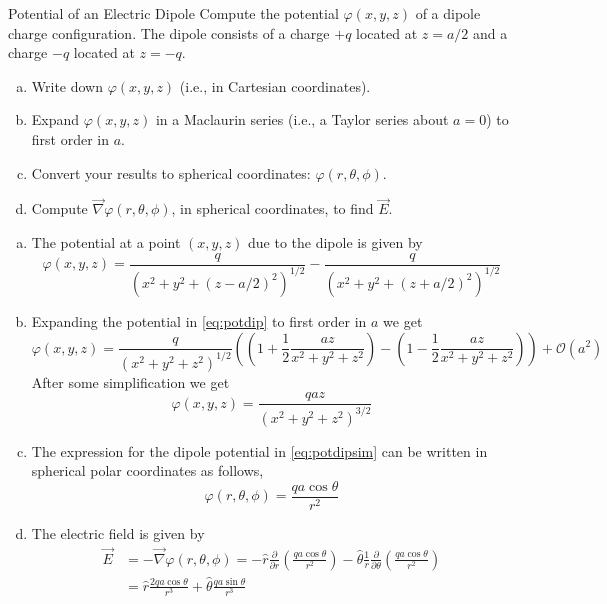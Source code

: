 \documentclass{esg8022pset}
\newcommand{\dtheta}{\frac{\partial}{\partial \theta}}
\newcommand{\dr}{\frac{\partial}{\partial r}}
\begin{document}
\begin{problem}{Potential of an Electric Dipole}
  Compute the potential $\varphi(x,y,z)$ of a dipole charge configuration.  The dipole consists of a charge $+q$ located at $z = a/2$ and a charge $-q$ located at $z=-q$.
  \begin{enumerate}[(a)]
    \item Write down $\varphi(x,y,z)$ (i.e., in Cartesian coordinates).
    \item Expand $\varphi(x,y,z)$ in a Maclaurin series (i.e., a Taylor series about $a=0$) to first order in $a$.
    \item Convert your results to spherical coordinates: $\varphi(r, \theta, \phi)$. 
    \item Compute $\vec{\nabla}\varphi(r, \theta, \phi)$, in spherical coordinates, to find $\vec{E}$. %
  \end{enumerate}
\end{problem}
\begin{solution}
  \begin{enumerate}[(a)]
    \item The potential at a point $(x,y,z)$ due to the dipole is given by
      \begin{equation}
        \varphi(x,y,z) = \frac{q}{\left( x^2 + y^2 +(z-a/2)^2 \right)^{1/2}} - \frac{q}{\left( x^2 + y^2 +(z+a/2)^2 \right)^{1/2}} \label{eq:potdip}
      \end{equation}
    \item Expanding the potential in \autoref{eq:potdip} to first order in $a$ we get
      $$\varphi(x,y,z) = \frac{q}{\left( x^2 + y^2 +z^2 \right)^{1/2}}\left( \left( 1+ \frac{1}{2} \frac{az}{x^2 + y^2 + z^2} \right) - \left(1-\frac{1}{2} \frac{az}{x^2 + y^2 + z^2} \right)\right) + \mathcal O(a^2)$$
      After some simplification we get
      \begin{equation}  \varphi(x,y,z) = \frac{q az}{\left( x^2 + y^2 +z^2 \right)^{3/2}} \label{eq:potdipsim}\end{equation}
    \item The expression for the dipole potential in \autoref{eq:potdipsim} can be written in spherical polar coordinates as follows,
      $$\varphi(r,\theta,\phi) = \frac{q a \cos \theta}{r ^2}$$
    \item The electric field is given by
      \begin{align*}
        \vec{E} & = - \vec{\nabla}\varphi(r,\theta,\phi) = - \hat r \dr \left( \frac{qa \cos \theta}{r^2} \right) - \hat\theta \frac{1}{r}\dtheta \left( \frac{qa \cos \theta}{r^2} \right) \\
          & = \hat r\frac{2 qa \cos \theta}{r^3} + \hat\theta \frac{qa \sin \theta}{r^3}
      \end{align*}
  \end{enumerate}
\end{solution}
\end{document}

